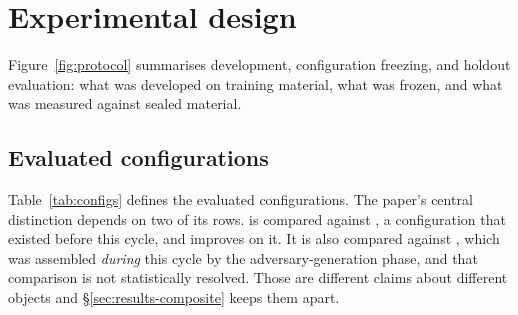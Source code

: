 \section{Experimental design}
\label{sec:design}

Figure~\ref{fig:protocol} summarises development, configuration freezing, and holdout evaluation:
what was developed on training material, what was frozen, and what was measured against sealed
material.

\subsection{Evaluated configurations}
\label{sec:design-configs}

Table~\ref{tab:configs} defines the evaluated configurations. The paper's central distinction
depends on two of its rows. \sestina{} is compared against \fcheap{}, a configuration that existed
before this cycle, and improves on it. It is also compared against \composite{}, which was
assembled \emph{during} this cycle by the adversary-generation phase, and that comparison is not
statistically resolved. Those are different claims about different objects and
\S\ref{sec:results-composite} keeps them apart.

